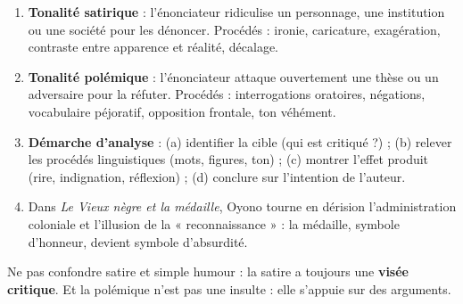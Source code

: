 \documentclass[11pt]{article}
\newcommand{\cle}[1]{{\popxbold\color{popdark}#1}}
\begin{document}
\begin{methode}
\begin{enumerate}
\item \textbf{Tonalité satirique} : l'énonciateur \cle{ridiculise} un personnage, une institution ou une société pour les dénoncer. Procédés : ironie, caricature, exagération, contraste entre apparence et réalité, décalage.
\item \textbf{Tonalité polémique} : l'énonciateur \cle{attaque ouvertement} une thèse ou un adversaire pour la réfuter. Procédés : interrogations oratoires, négations, vocabulaire péjoratif, opposition frontale, ton véhément.
\item \textbf{Démarche d'analyse} : (a) identifier la cible (qui est critiqué ?) ; (b) relever les procédés linguistiques (mots, figures, ton) ; (c) montrer l'effet produit (rire, indignation, réflexion) ; (d) conclure sur l'intention de l'auteur.
\item Dans \emph{Le Vieux nègre et la médaille}, Oyono tourne en dérision l'administration coloniale et l'illusion de la « reconnaissance » : la médaille, symbole d'honneur, devient symbole d'absurdité.
\end{enumerate}
\begin{attention}
Ne pas confondre satire et simple humour : la satire a toujours une \textbf{visée critique}. Et la polémique n'est pas une insulte : elle s'appuie sur des arguments.
\end{attention}
\end{methode}
\end{document}
